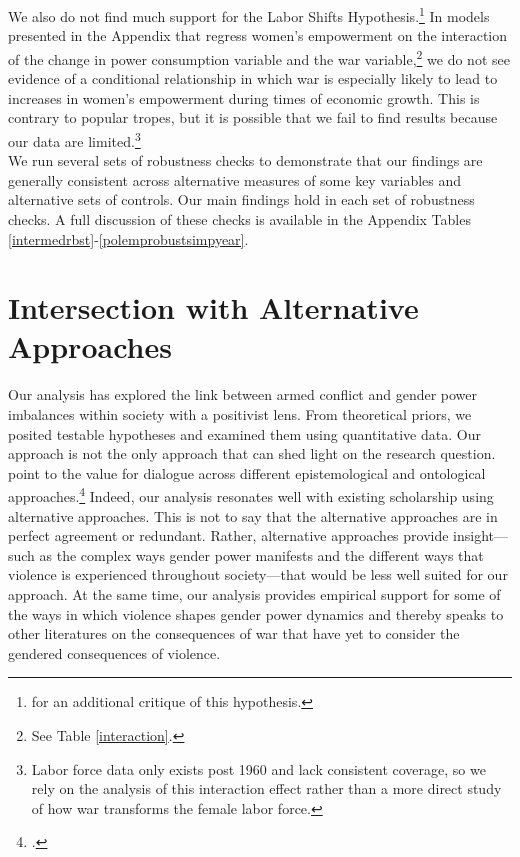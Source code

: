 \documentclass [12pt] {article}
\begin{document}
We also do not find much support for the Labor Shifts Hypothesis.\footnote{ for an additional critique of this hypothesis.} In models presented in the Appendix that regress women's empowerment on the interaction of the change in power consumption variable and the war variable,\footnote{See Table \ref{interaction}.} we do not see evidence of a conditional relationship in which war is especially likely to lead to increases in women's empowerment during times of economic growth. This is contrary to popular tropes, but it is possible that we fail to find results because our data are limited.\footnote{Labor force data only exists post 1960 and lack consistent coverage, so we rely on the analysis of this interaction effect rather than a more direct study of how war transforms the female labor force.}  \\

We run several sets of robustness checks to demonstrate that our findings are generally consistent across alternative measures of some key variables and alternative sets of controls. Our main findings hold in each set of robustness checks. A full discussion of these checks is available in the Appendix Tables \ref{intermedrbst}-\ref{polemprobustsimpyear}. \\


\section*{Intersection with Alternative Approaches} 
\vspace*{.2in}

Our analysis has explored the link between armed conflict and gender power imbalances within society with a positivist lens. From theoretical priors, we posited testable hypotheses and examined them using quantitative data. Our approach is not the only approach that can shed light on the research question. \citeauthor{sjoberg2017reevaluating} point to the value for dialogue across different epistemological and ontological approaches.\footnote{.} Indeed, our analysis resonates well with existing scholarship using alternative approaches. This is not to say that the alternative approaches are in perfect agreement or redundant. Rather, alternative approaches provide insight---such as the complex ways gender power manifests and the different ways that violence is experienced throughout society---that would be less well suited for our approach. At the same time, our analysis provides empirical support for some of the ways in which violence shapes gender power dynamics and thereby speaks to other literatures on the consequences of war that have yet to consider the gendered consequences of violence. \\
\end{document}
